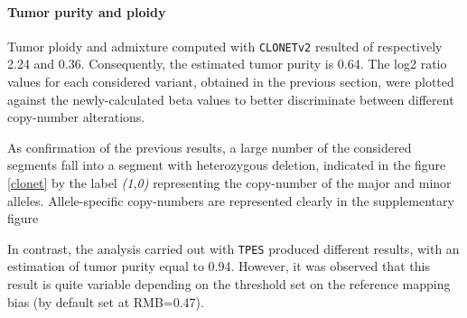 \documentclass[11pt]{article}
\begin{document}
\paragraph{Tumor purity and ploidy}

Tumor ploidy and admixture computed with \texttt{CLONETv2} resulted of respectively 2.24 and 0.36. Consequently, the estimated tumor purity is 0.64. The log2 ratio values for each considered variant, obtained in the previous section, were plotted against the newly-calculated beta values to better discriminate between different copy-number alterations.

As confirmation of the previous results, a large number of the considered segments fall into a segment with heterozygous deletion, indicated in the figure \ref{clonet} by the label \textit{(1,0)} representing the copy-number of the major and minor alleles. Allele-specific copy-numbers are represented clearly in the supplementary figure 

In contrast, the analysis carried out with \texttt{TPES} produced different results, with an estimation of tumor purity equal to 0.94. However, it was observed that this result is quite variable depending on the threshold set on the reference mapping bias (by default set at RMB=0.47).
\end{document}
